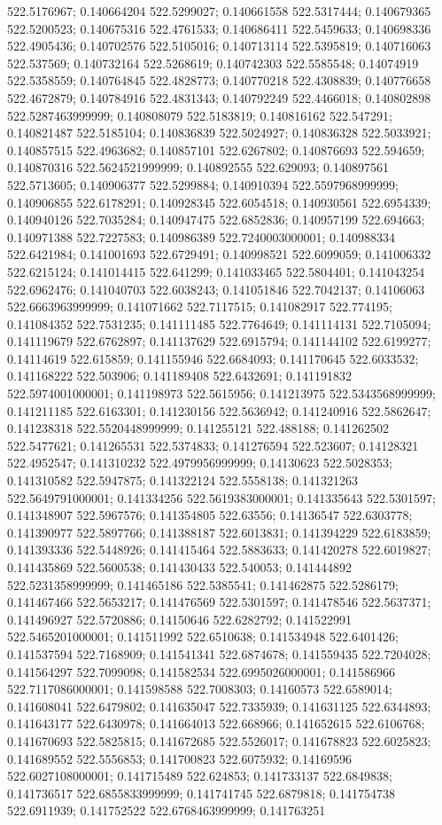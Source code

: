 522.5176967; 0.140664204 522.5299027; 0.140661558 522.5317444; 0.140679365 522.5200523; 0.140675316 522.4761533; 0.140686411 522.5459633; 0.140698336 522.4905436; 0.140702576 522.5105016; 0.140713114 522.5395819; 0.140716063 522.537569; 0.140732164 522.5268619; 0.140742303 522.5585548; 0.14074919 522.5358559; 0.140764845 522.4828773; 0.140770218 522.4308839; 0.140776658 522.4672879; 0.140784916 522.4831343; 0.140792249 522.4466018; 0.140802898 522.5287463999999; 0.140808079 522.5183819; 0.140816162 522.547291; 0.140821487 522.5185104; 0.140836839 522.5024927; 0.140836328 522.5033921; 0.140857515 522.4963682; 0.140857101 522.6267802; 0.140876693 522.594659; 0.140870316 522.5624521999999; 0.140892555 522.629093; 0.140897561 522.5713605; 0.140906377 522.5299884; 0.140910394 522.5597968999999; 0.140906855 522.6178291; 0.140928345 522.6054518; 0.140930561 522.6954339; 0.140940126 522.7035284; 0.140947475 522.6852836; 0.140957199 522.694663; 0.140971388 522.7227583; 0.140986389 522.7240003000001; 0.140988334 522.6421984; 0.141001693 522.6729491; 0.140998521 522.6099059; 0.141006332 522.6215124; 0.141014415 522.641299; 0.141033465 522.5804401; 0.141043254 522.6962476; 0.141040703 522.6038243; 0.141051846 522.7042137; 0.14106063 522.6663963999999; 0.141071662 522.7117515; 0.141082917 522.774195; 0.141084352 522.7531235; 0.141111485 522.7764649; 0.141114131 522.7105094; 0.141119679 522.6762897; 0.141137629 522.6915794; 0.141144102 522.6199277; 0.14114619 522.615859; 0.141155946 522.6684093; 0.141170645 522.6033532; 0.141168222 522.503906; 0.141189408 522.6432691; 0.141191832 522.5974001000001; 0.141198973 522.5615956; 0.141213975 522.5343568999999; 0.141211185 522.6163301; 0.141230156 522.5636942; 0.141240916 522.5862647; 0.141238318 522.5520448999999; 0.141255121 522.488188; 0.141262502 522.5477621; 0.141265531 522.5374833; 0.141276594 522.523607; 0.14128321 522.4952547; 0.141310232 522.4979956999999; 0.14130623 522.5028353; 0.141310582 522.5947875; 0.141322124 522.5558138; 0.141321263 522.5649791000001; 0.141334256 522.5619383000001; 0.141335643 522.5301597; 0.141348907 522.5967576; 0.141354805 522.63556; 0.14136547 522.6303778; 0.141390977 522.5897766; 0.141388187 522.6013831; 0.141394229 522.6183859; 0.141393336 522.5448926; 0.141415464 522.5883633; 0.141420278 522.6019827; 0.141435869 522.5600538; 0.141430433 522.540053; 0.141444892 522.5231358999999; 0.141465186 522.5385541; 0.141462875 522.5286179; 0.141467466 522.5653217; 0.141476569 522.5301597; 0.141478546 522.5637371; 0.141496927 522.5720886; 0.14150646 522.6282792; 0.141522991 522.5465201000001; 0.141511992 522.6510638; 0.141534948 522.6401426; 0.141537594 522.7168909; 0.141541341 522.6874678; 0.141559435 522.7204028; 0.141564297 522.7099098; 0.141582534 522.6995026000001; 0.141586966 522.7117086000001; 0.141598588 522.7008303; 0.14160573 522.6589014; 0.141608041 522.6479802; 0.141635047 522.7335939; 0.141631125 522.6344893; 0.141643177 522.6430978; 0.141664013 522.668966; 0.141652615 522.6106768; 0.141670693 522.5825815; 0.141672685 522.5526017; 0.141678823 522.6025823; 0.141689552 522.5556853; 0.141700823 522.6075932; 0.14169596 522.6027108000001; 0.141715489 522.624853; 0.141733137 522.6849838; 0.141736517 522.6855833999999; 0.141741745 522.6879818; 0.141754738 522.6911939; 0.141752522 522.6768463999999; 0.141763251 